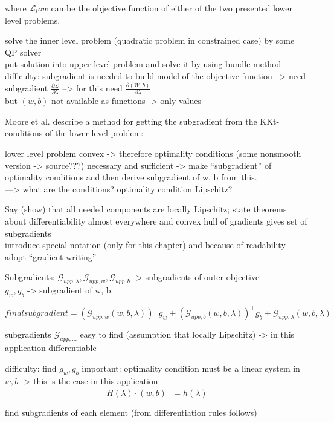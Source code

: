 where \(\mathcal{L}_low\) can be the objective function of either of the two presented lower level problems.



solve the inner level problem (quadratic problem in constrained case) by some QP solver \\
put solution into upper level problem and solve it by using bundle method \\
difficulty: subgradient is needed to build model of the objective function --> need subgradient \(\frac{\partial \mathcal{L}}{\partial \lambda}\) --> for this need \(\frac{\partial (W,b)}{\partial \lambda}\) \\
but \((w,b)\) not available as functions -> only values

Moore et al. \cite{Moore2011} describe a method for getting the subgradient from the KKt-conditions of the lower level problem:

lower level problem convex -> therefore optimality conditions (some nonsmooth version -> source???) necessary and sufficient -> make ``subgradient'' of optimality conditions and then derive subgradient of w, b from this. \\
---> what are the conditions? optimality condition Lipschitz? 

Say (show) that all needed components are locally Lipschitz; state theorems about differentiability almost everywhere and convex hull of gradients gives set of subgradients\\
introduce special notation (only for this chapter) and because of readability adopt ``gradient writing''

Subgradients:
\(\mathcal{G}_{upp,\lambda}, \mathcal{G}_{upp,w},\mathcal{G}_{upp,b}\) -> subgradients of outer objective \\
\(g_w, g_b\) -> subgradient of w, b

\[ final subgradient = \left(\mathcal{G}_{upp,w}(w,b,\lambda)\right)^{\top}g_w+\left(\mathcal{G}_{upp,b}(w,b,\lambda)\right)^{\top}g_b+\mathcal{G}_{upp,\lambda}(w,b,\lambda) \]

subgradients \(\mathcal{G}_{upp,...}\) easy to find (assumption that locally Lipschitz) -> in this application differentiable

difficulty: find \(g_w, g_b\)
important: optimality condition must be a linear system in \(w,b\) -> this is the case in this application
\[ H(\lambda)\cdot (w,b)^{\top} = h(\lambda) \]

find subgradients of each element (from differentiation rules follows)

